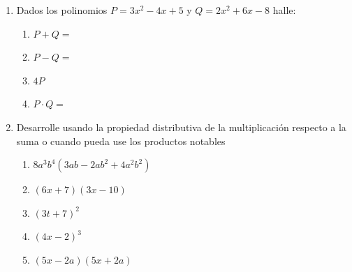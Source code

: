 \documentclass[letterpaper,fleqn]{article}
\begin{document}
\begin{enumerate}
\begin{enumerate}
\end{enumerate}
\item Dados los polinomios $P=3x^{2}-4x+5$ y $Q=2x^{2}+6x-8$ halle:
\begin{enumerate}
 \item $P+Q=$\noanswer
 \item $P-Q=$\noanswer
 \item $4P$\noanswer
 \item $P\cdot Q=$\noanswer
\end{enumerate}
\item Desarrolle usando la propiedad distributiva de la multiplicación respecto a la suma o cuando pueda use los productos notables
\begin{enumerate}
 \item $8a^{3}b^{4}(3ab-2ab^{2}+4a^{2}b^{2})$
 \item $(6x+7)(3x-10)$
 \item $(3t+7)^{2}$
 \item $(4x-2)^{3}$
 \item $(5x-2a)(5x+2a)$
\end{enumerate}
 \end{enumerate}
\end{document}
